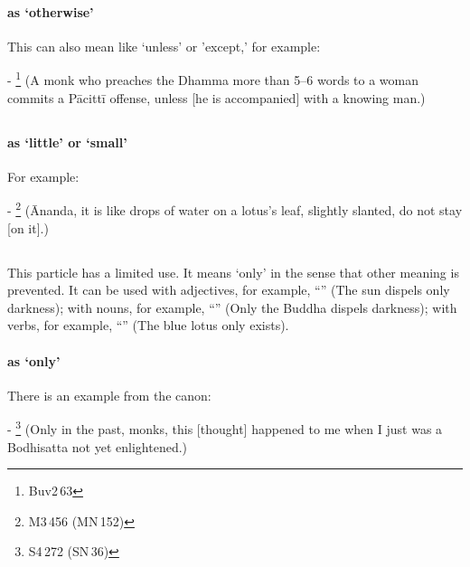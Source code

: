 \paragraph*{ as `otherwise'} This can also mean like `unless' or 'except,' for example:\par
- \footnote{Buv2\,63} (A monk who preaches the Dhamma more than 5--6 words to a woman commits a P\=acitt\=i offense, unless [he is accompanied] with a knowing man.) \par

\subsection*{}\label{nip:iisakadm}
\paragraph*{ as `little' or `small'} For example:\par
- \footnote{M3\,456 (MN\,152)} (\=Ananda, it is like drops of water on a lotus's leaf, slightly slanted, do not stay [on it].) \par

\subsection*{}\label{nip:eva}
This particle has a limited use. It means `only' in the sense that other meaning is prevented. It can be used with adjectives, for example, ``'' (The sun dispels only darkness); with nouns, for example, ``'' (Only the Buddha dispels darkness); with verbs, for example, ``'' (The blue lotus only exists).
\paragraph*{ as `only'} There is an example from the canon:\par
- \footnote{S4\,272 (SN\,36)} (Only in the past, monks, this [thought] happened to me when I just was a Bodhisatta not yet enlightened.) \par

